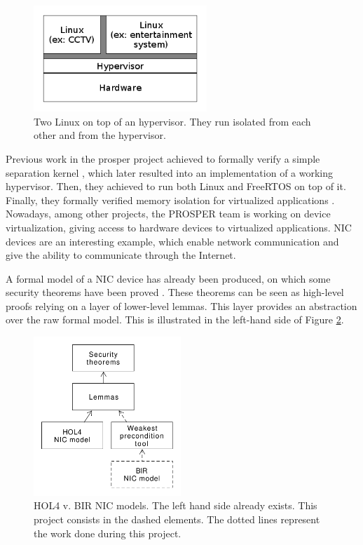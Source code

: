 \documentclass{kththesis}
\begin{document}
\begin{figure}[ht]
	\includegraphics[height=4cm]{figures/figure-hypervisor-simple.png}
	\centering
	\caption{Two Linux on top of an hypervisor. They run isolated from each other and from the hypervisor.}
	\label{figure-hypervisor-simple}
\end{figure}

Previous work in the \acrshort{prosper} project achieved to formally verify a simple separation kernel \cite{noauthor_prosper:_nodate-1,dam_formal_2013}, which later resulted into an implementation of a working hypervisor. Then, they achieved to run both Linux and \gls{FreeRTOS} on top of it. Finally, they formally verified memory isolation for virtualized applications \cite{nemati_trustworthy_2015}. Nowadays, among other projects, the PROSPER team is working on device virtualization, giving access to hardware devices to virtualized applications. \gls{NIC} devices are an interesting example, which enable network communication and give the ability to communicate through the Internet.

A formal model of a \gls{NIC} device has already been produced, on
which some security theorems have been proved
\cite{haglund_formal_2016}. These theorems can be seen as high-level
proofs relying on a layer of lower-level lemmas.
This layer provides an abstraction over the raw formal model. This is illustrated in the left-hand side of Figure \ref{hol-v-bir-nic-model-simple}.

\begin{figure}[ht]
	\includegraphics[height=6cm]{figures/hol-v-bir-nic-model-simple.png}
	\centering
	\caption{HOL4 v. BIR NIC models. The left hand side already exists. This project consists in the dashed elements. The dotted lines represent the work done during this project.}
	\label{hol-v-bir-nic-model-simple}
\end{figure}
\end{document}
